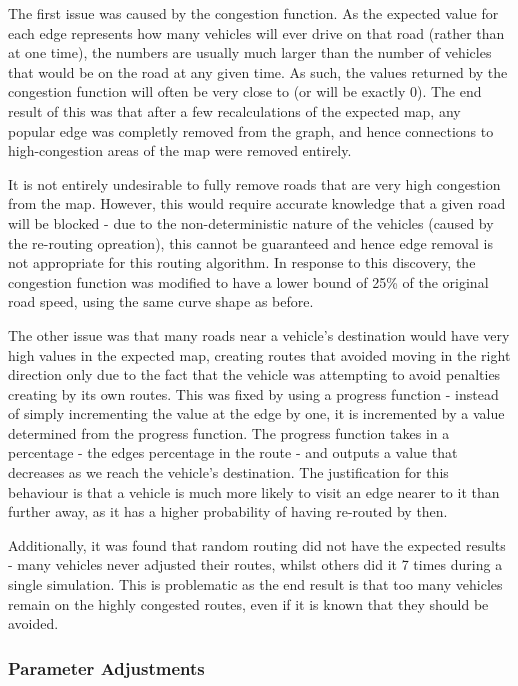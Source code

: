 \documentclass[ %
                    author={Alexander Hill},
                supervisor={Dr. Benjamin Sach},
                    degree={MEng},
                     title={MARMOSET},
                  subtitle={Multi-Agent Route Management using Online Simulation for Efficient Transportation},
                      type={research},
                      year={2016} ]{dissertation}
\begin{document}
The first issue was caused by the congestion function. As the expected value
for each edge represents how many vehicles will ever drive on that road (rather
than at one time), the numbers are usually much larger than the number of
vehicles that would be on the road at any given time. As such, the values
returned by the congestion function will often be very close to (or will be
exactly 0). The end result of this was that after a few recalculations of the
expected map, any popular edge was completly removed from the graph, and hence
connections to high-congestion areas of the map were removed entirely.

It is not entirely undesirable to fully remove roads that are very high
congestion from the map. However, this would require accurate knowledge that a
given road will be blocked - due to the non-deterministic nature of the vehicles
(caused by the re-routing opreation), this cannot be guaranteed and hence edge
removal is not appropriate for this routing algorithm. In response to this
discovery, the congestion function was modified to have a lower bound of 25\% of
the original road speed, using the same curve shape as before.

The other issue was that many roads near a vehicle's destination would have very
high values in the expected map, creating routes that avoided moving in the
right direction only due to the fact that the vehicle was attempting to avoid
penalties creating by its own routes. This was fixed by using a progress
function - instead of simply incrementing the value at the edge by one, it is
incremented by a value determined from the progress function. The progress
function takes in a percentage - the edges percentage in the route - and outputs
a value that decreases as we reach the vehicle's destination. The justification
for this behaviour is that a vehicle is much more likely to visit an edge
nearer to it than further away, as it has a higher probability of having
re-routed by then.

Additionally, it was found that random routing did not have the expected results
- many vehicles never adjusted their routes, whilst others did it 7 times during
a single simulation. This is problematic as the end result is that too many
vehicles remain on the highly congested routes, even if it is known that they
should be avoided.

\subsubsection{Parameter Adjustments}
\end{document}
